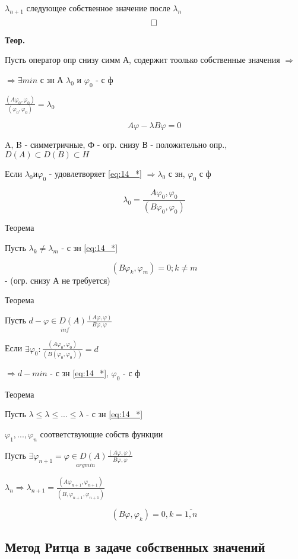 \documentclass[12pt, a4paper]{article}
\begin{document}
$ \lambda_{n+1}$ следующее собственное значение после $ \lambda_n $
\[ \hfill \square \]

\textbf{Теор.}

Пусть оператор опр снизу симм А, содержит тоолько собственные значения  $ \Rightarrow $

$ \Rightarrow \exists min  $ с зн А $ \lambda_0 $ и $ \varphi_0  $ - с ф

$ \frac{(A\varphi_0, \varphi_0)}{(\varphi_0, \varphi_0)} = \lambda_0 $

\[ A \varphi - \lambda B \varphi = 0 \label{eq:14_*} \]

A, B - симметричные, Ф - огр. снизу
В - положительно опр., $  D(A) \subset D(B) \subset H $

Если $ \lambda_0 и \varphi_0 $ - удовлетворяет \ref{eq:14_*} $ \Rightarrow \lambda_0 $ с зн, $ \varphi_0 $ с ф

\[ \lambda_0 = \frac{A \varphi_0, \varphi_0}{(B \varphi_0, \varphi_0)} \]

Теорема

Пусть $ \lambda_k \neq \lambda_m  $ - с зн \ref{eq:14_*}

\[ (B \varphi_k, \varphi_m) = 0; k \neq m  \] - (огр. снизу А не требуется)


Теорема

Пусть $ d - \underset{inf}{\varphi \in D(A)} \frac{(A \varphi, \varphi)}{B \varphi, \varphi} $

Если $ \exists \varphi_0: \frac{(A \varphi_0, \varphi_0)}{(B(\varphi_0, \varphi_0))} = d $

$ \Rightarrow d - min $ - с зн \ref{eq:14_*}, $ \varphi_0 $ - с ф

Теорема

Пусть $ \lambda \leq \lambda \leq ... \leq \lambda $ - с зн \ref{eq:14_*}

$ \varphi_1, ... , \varphi_n $ соответствующие собств функции

Пусть $ \exists \varphi_{n+1} = \underset{argmin}{\varphi \in D(A)}\frac{(A \varphi, \varphi)}{B \varphi, \varphi} $

$ \lambda_n \Rightarrow \lambda_{n+1} = \frac{(A \varphi_{n+1}, \varphi_{n+1})}{(B, \varphi_{n+1}, \varphi_{n+1})} $

\[ (B\varphi, \varphi_k) = 0, k = \overline{1, n} \]

\subsection{Метод Ритца в задаче собственных значений}
\end{document}
